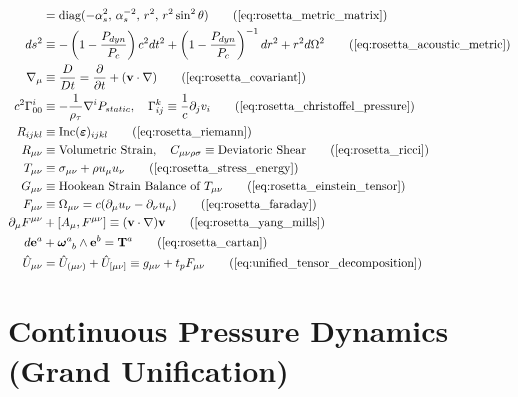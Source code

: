 \begin{tcolorbox}[recallbox, title={\ref{box:rosetta_stone}. Tensor Evolution \& Geometric Bending}]
\begin{align}
    [\boldsymbol{g}_{\mu\nu}] &= \text{diag}(-\alpha_s^2, \, \alpha_s^{-2}, \, r^2, \, r^2\sin^2\theta) \tag{\ref{eq:rosetta_metric_matrix}} \\
    ds^2 &\equiv -\left( 1 - \frac{P_{dyn}}{P_c} \right) c^2 dt^2 + \left( 1 - \frac{P_{dyn}}{P_c} \right)^{-1} dr^2 + r^2 d\Omega^2 \tag{\ref{eq:rosetta_acoustic_metric}} \\
    \nabla_\mu &\equiv \frac{D}{Dt} = \frac{\partial}{\partial t} + (\mathbf{v} \cdot \nabla) \tag{\ref{eq:rosetta_covariant}}  \\
    c^2 \Gamma^i_{00} &\equiv -\frac{1}{\rho_{\tau}} \nabla^i P_{static}, \quad \Gamma^k_{ij} \equiv \frac{1}{c} \partial_j v_i \tag{\ref{eq:rosetta_christoffel_pressure}} \\
    R_{ijkl} &\equiv \text{Inc}(\boldsymbol{\varepsilon})_{ijkl} \tag{\ref{eq:rosetta_riemann}} \\
    R_{\mu\nu} &\equiv \text{Volumetric Strain}, \quad C_{\mu\nu\rho\sigma} \equiv \text{Deviatoric Shear} \tag{\ref{eq:rosetta_ricci}} \\
    T_{\mu\nu} &\equiv \sigma_{\mu\nu} + \rho u_\mu u_\nu \tag{\ref{eq:rosetta_stress_energy}} \\
    G_{\mu\nu} &\equiv \text{Hookean Strain Balance of } T_{\mu\nu} \tag{\ref{eq:rosetta_einstein_tensor}} \\
    F_{\mu\nu} &\equiv \Omega_{\mu\nu} = c (\partial_\mu u_\nu - \partial_\nu u_\mu) \tag{\ref{eq:rosetta_faraday}}  \\
    \partial_\mu F^{\mu\nu} &+ [A_\mu, F^{\mu\nu}] \equiv (\mathbf{v} \cdot \nabla)\mathbf{v} \tag{\ref{eq:rosetta_yang_mills}}  \\
    d\mathbf{e}^a &+ \boldsymbol{\omega}^a_{\phantom{a}b} \wedge \mathbf{e}^b = \mathbf{T}^a \tag{\ref{eq:rosetta_cartan}} \\
    \hat{U}_{\mu\nu} &= \hat{U}_{(\mu\nu)} + \hat{U}_{[\mu\nu]} \equiv g_{\mu\nu} + t_p F_{\mu\nu} \tag{\ref{eq:unified_tensor_decomposition}} \end{align}
\end{tcolorbox}


\section{Continuous Pressure Dynamics (Grand Unification)}
\label{sec:deriv_pressure_gradient}

